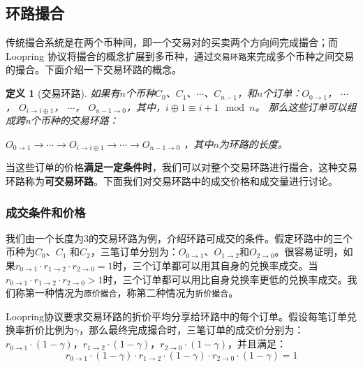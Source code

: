 \documentclass[UTF8,nofonts]{ctexart}
\newtheorem{definition}{定义}[section]
\begin{document}
\subsection{环路撮合}

传统撮合系统是在两个币种间，即一个交易对的买卖两个方向间完成撮合；而Loopring 协议将撮合的概念扩展到多币种，通过\texttt{交易环路}来完成多个币种之间交易的撮合。下面介绍一下交易环路的概念。

\begin{definition}[交易环路]
如果有$n$个币种$C_{0}$、$C_{1}$、$\cdots$、$C_{n-1}$，和$n$个订单：$O_{0\rightarrow 1}$， $\cdots$， $O_{i\rightarrow i\oplus 1}$， $\cdots$， $O_{n-1 \rightarrow 0}$，其中，$i\oplus 1 \equiv i+1 \mod n$。
那么这些订单可以组成跨n个币种的交易环路：

$O_{0\rightarrow 1} \rightarrow \cdots \rightarrow O_{i\rightarrow i\oplus 1} \rightarrow \cdots \rightarrow O_{n-1\rightarrow 0}$ ，其中$n$为环路的长度。
\end{definition}

当这些订单的价格\textbf{满足一定条件时}，我们可以对整个交易环路进行撮合，这种交易环路称为\textbf{可交易环路}。下面我们对交易环路中的成交价格和成交量进行讨论。


\subsubsection{成交条件和价格\label{sec:matchprice}}

我们由一个长度为3的交易环路为例，介绍环路可成交的条件。假定环路中的三个币种为$C_{0}$、$C_{1}$ 和$C_{2}$，三笔订单分别为：$O_{0\rightarrow 1}$、$O_{1 \rightarrow 2}$和$O_{2 \rightarrow 0}$。很容易证明，如果$r_{0 \rightarrow 1} \cdot r_{1 \rightarrow 2}\cdot r_{2 \rightarrow 0} = 1$时，三个订单都可以用其自身的兑换率成交。当$r_{0 \rightarrow 1} \cdot r_{1 \rightarrow 2}\cdot r_{2 \rightarrow 0} > 1$时，三个订单都可以用比自身兑换率更低的兑换率成交。我们称第一种情况为\texttt{原价撮合}，称第二种情况为\texttt{折价撮合}。

Loopring协议要求交易环路的折价平均分享给环路中的每个订单。假设每笔订单兑换率折价比例为$\gamma$，那么最终完成撮合时，三笔订单的成交价分别为：$r_{0\rightarrow 1} \cdot (1-\gamma)$，$r_{1\rightarrow 2} \cdot (1-\gamma)$，$r_{2 \rightarrow 0} \cdot (1-\gamma)$，并且满足：
\begin{equation}
r_{0\rightarrow 1} \cdot (1-\gamma)\cdot r_{1\rightarrow 2} \cdot (1-\gamma) \cdot r_{2 \rightarrow 0} \cdot (1-\gamma) = 1
\end{equation}
\end{document}
